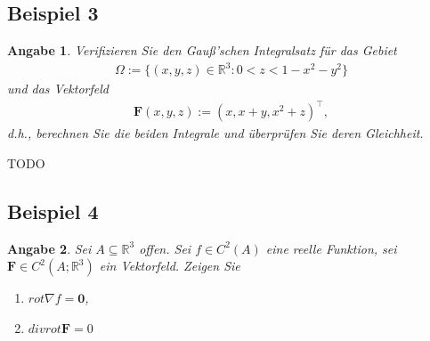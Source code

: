 \documentclass[]{article}
\newtheorem*{angabe*}{Angabe}
\begin{document}
\subsection*{Beispiel 3}
\begin{angabe*}
	Verifizieren Sie den Gauß'schen Integralsatz für das Gebiet
	\begin{align*}
		\Omega := \{(x,y,z) \in \mathbb{R}^3: 0<z<1-x^2-y^2\}
	\end{align*}
	und das Vektorfeld
	\begin{align*}
		\bm{F}(x,y,z) := (x, x+y, x^2+z)^\top,
	\end{align*}
	d.h., berechnen Sie die beiden Integrale und überprüfen Sie deren Gleichheit.
\end{angabe*}

TODO

\subsection*{Beispiel 4}
\begin{angabe*}
	Sei $A \subseteq \mathbb{R}^3$ offen. Sei $f\in C^2(A)$ eine reelle Funktion, sei $\bm{F} \in C^2(A;\mathbb{R}^3)$ ein Vektorfeld. Zeigen Sie
	\begin{enumerate}[label=(\roman*)]
		\item $rot\nabla f = \bm{0}$,
		\item $div rot \bm{F} = 0$
	\end{enumerate}
\end{angabe*}
\end{document}
